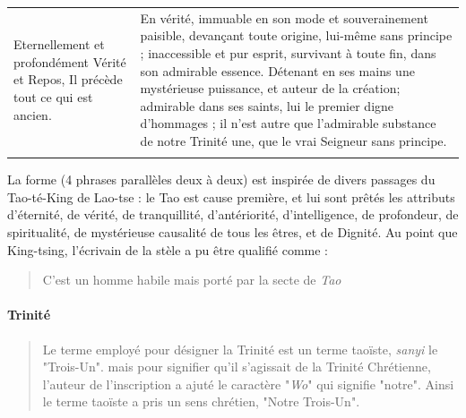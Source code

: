 \begin{table}[h!]
\begin{tabular}{p{5cm}p{5cm}}
Eternellement et profondément Vérité et Repos, Il précède tout ce qui est ancien. & En vérité, immuable en son mode et souverainement paisible,  devançant toute origine, lui-même sans principe ; inaccessible et  pur esprit, survivant à toute fin, dans son  admirable essence. Détenant en ses mains  une mystérieuse puissance, et auteur de la création; admirable dans ses saints, lui le  premier digne d'hommages ; il n'est autre  que l'admirable substance de notre Trinité  une, que le vrai Seigneur sans principe.  \\
                                                  &               \\
\end{tabular}
\end{table}
La forme (4 phrases parallèles deux à deux) est inspirée de divers passages du Tao-té-King de Lao-tse : le Tao est cause première,  et lui sont prêtés les attributs d'éternité, de vérité, de tranquillité, d'antériorité, d'intelligence, de profondeur, de spiritualité, de mystérieuse causalité de tous les êtres, et de Dignité. 
Au point que King-tsing, l'écrivain de la stèle a pu être qualifié comme :
\begin{quote}
    C'est un homme habile mais porté par la secte de \textit{Tao} 
\end{quote}

\paragraph{Trinité}
\begin{quote} Le terme employé pour désigner la Trinité est un terme taoïste, \emph{sanyi} le "Trois-Un". mais pour signifier qu'il s'agissait de la Trinité Chrétienne, l'auteur de l'inscription a ajuté le caractère "\emph{Wo}" qui signifie "notre". Ainsi le terme taoïste a pris un sens chrétien, "Notre Trois-Un".
    \cite[p.43]{Raguin:JesusMessieXian}
\end{quote}


